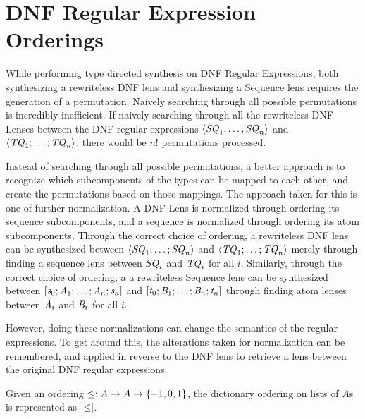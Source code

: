 \documentclass[numbers]{sigplanconf}
\begin{document}
\section{DNF Regular Expression Orderings}
While performing type directed synthesis on DNF Regular Expressions, both
synthesizing a rewriteless DNF lens and synthesizing a Sequence lens requires
the generation of a permutation.  Naively searching through all possible
permutations is incredibly inefficient.  If naively searching through all the
rewriteless DNF Lenses between
the DNF regular expressions $\langle\mathit{SQ}_1;\ldots;\mathit{SQ}_n\rangle$ and
$\langle\mathit{TQ}_1;\ldots;\mathit{TQ}_n\rangle$, there would be $n!$ permutations
processed.

Instead of searching through all possible permutations, a better approach is to
recognize which subcomponents of the types can be mapped to each other, and
create the permutations based on those mappings.  The approach taken for this is
one of further normalization.  A DNF Lens is normalized through ordering its
sequence subcomponents, and a sequence is normalized through ordering its atom
subcomponents.  Through the correct choice of ordering, a rewriteless DNF lens
can be synthesized between $\langle\mathit{SQ}_1;\ldots;\mathit{SQ}_n\rangle$ and
$\langle\mathit{TQ}_1;\ldots;\mathit{TQ}_n\rangle$ merely through finding a sequence
lens between $\mathit{SQ}_i$ and $\mathit{TQ}_i$ for all $i$.  Similarly, through
the correct choice of ordering, a a rewriteless Sequence lens can be synthesized
between $[\mathit{s}_0;\mathit{A}_1;\ldots;\mathit{A}_n;\mathit{s}_n]$ and
$[\mathit{t}_0;\mathit{B}_1;\ldots;\mathit{B}_n;\mathit{t}_n]$ through
finding atom lenses between $\mathit{A}_i$ and $\mathit{B}_i$ for all $i$.

However, doing these normalizations can change the semantics of the regular
expressions.  To get around this, the alterations taken for normalization can be
remembered, and applied in reverse to the DNF lens to retrieve a lens between
the original DNF regular expressions.

\begin{definition}
  Given an ordering $\leq : A \rightarrow A \rightarrow \{-1,0,1\}$,
  the dictionary ordering on lists of $A$s is represented as $[ \leq ]$.
\end{definition}

\end{document}
